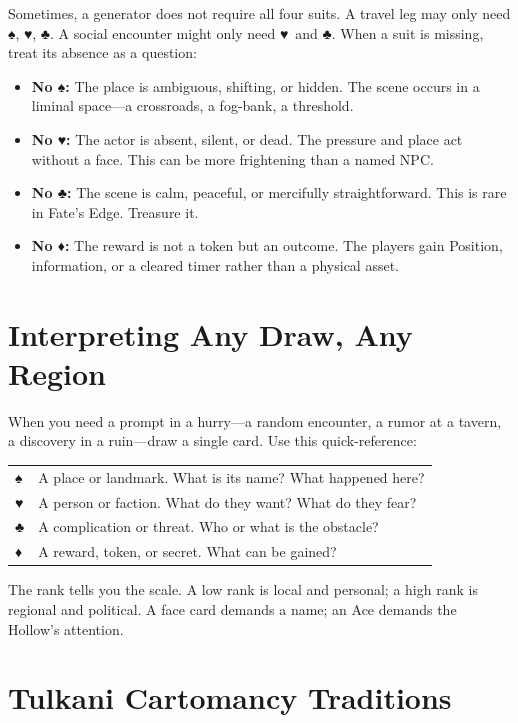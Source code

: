 \documentclass[12pt,oneside]{book}
\renewcommand{\spadesuit}{♠}
\renewcommand{\heartsuit}{♥}
\renewcommand{\clubsuit}{♣}
\renewcommand{\diamondsuit}{♦}
\begin{document}
Sometimes, a generator does not require all four suits. A travel leg may only need \spadesuit, \heartsuit, \clubsuit. A social encounter might only need \heartsuit\ and \clubsuit. When a suit is missing, treat its absence as a question:

\begin{itemize}
    \item \textbf{No \spadesuit:} The place is ambiguous, shifting, or hidden. The scene occurs in a liminal space---a crossroads, a fog-bank, a threshold.
    \item \textbf{No \heartsuit:} The actor is absent, silent, or dead. The pressure and place act without a face. This can be more frightening than a named NPC.
    \item \textbf{No \clubsuit:} The scene is calm, peaceful, or mercifully straightforward. This is rare in Fate's Edge. Treasure it.
    \item \textbf{No \diamondsuit:} The reward is not a token but an outcome. The players gain Position, information, or a cleared timer rather than a physical asset.
\end{itemize}

\section*{Interpreting Any Draw, Any Region}

When you need a prompt in a hurry---a random encounter, a rumor at a tavern, a discovery in a ruin---draw a single card. Use this quick-reference:

\begin{center}
\begin{tabular}{|l|l|}
\hline
\spadesuit & A place or landmark. What is its name? What happened here? \\
\heartsuit & A person or faction. What do they want? What do they fear? \\
\clubsuit & A complication or threat. Who or what is the obstacle? \\
\diamondsuit & A reward, token, or secret. What can be gained? \\
\hline
\end{tabular}
\end{center}

The rank tells you the scale. A low rank is local and personal; a high rank is regional and political. A face card demands a name; an Ace demands the Hollow's attention.

\section*{Tulkani Cartomancy Traditions}
\end{document}
